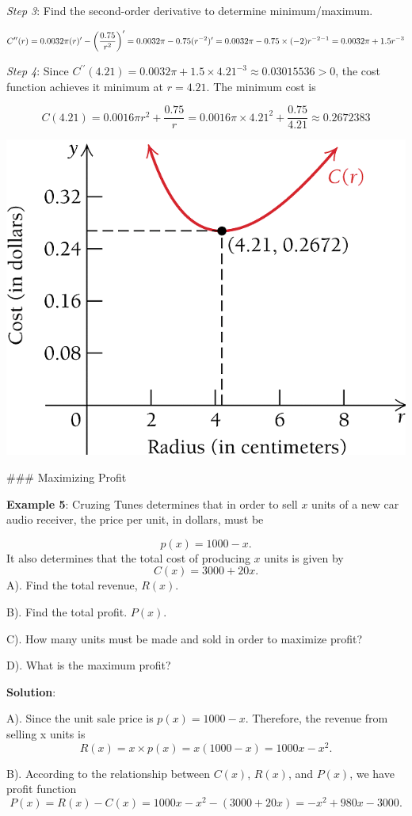 \documentclass[
]{book}
\begin{document}
\emph{Step 3}: Find the second-order derivative to determine minimum/maximum.

\[
C^{\prime\prime}(r)  = 0.0032\pi (r)^\prime - \left( \frac{0.75}{r^2}\right)^\prime  = 0.0032\pi - 0.75(r^{-2})^\prime \\ = 0.0032\pi - 0.75 \times (-2)r^{-2-1} = 0.0032\pi + 1.5 r^{-3}
\]

\emph{Step 4}: Since \(C^{\prime\prime}(4.21) = 0.0032\pi + 1.5\times 4.21^{-3} \approx 0.03015536 > 0\), the cost function achieves it minimum at \(r = 4.21\). The minimum cost is

\[
C(4.21) = 0.0016\pi r^2 + \frac{0.75}{r} = 0.0016\pi \times 4.21^2 + \frac{0.75}{4.21} \approx 0.2672383
\]

\begin{center}\includegraphics[width=0.4\linewidth]{img09/w09-example053} \end{center}

\hfill\break
\#\#\# Maximizing Profit

\textbf{Example 5}: Cruzing Tunes determines that in order to sell \(x\) units of a new car audio receiver, the price per unit, in dollars, must be

\[
p(x) = 1000 - x.
\]
It also determines that the total cost of producing \(x\) units is given by
\[
C(x) = 3000 + 20x.
\]
A). Find the total revenue, \(R(x)\).

B). Find the total profit. \(P(x)\).

C). How many units must be made and sold in order to maximize profit?

D). What is the maximum profit?

\textbf{Solution}:

A). Since the unit sale price is \(p(x) = 1000-x\). Therefore, the revenue from selling x units is
\[
R(x) = x\times p(x) = x(1000-x) = 1000x - x^2.
\]

B). According to the relationship between \(C(x)\), \(R(x)\), and \(P(x)\), we have profit function
\[
P(x) = R(x) - C(x) = 1000x - x^2 -(3000 + 20x) = -x^2 + 980x - 3000.
\]
\end{document}
